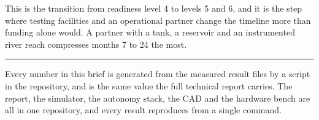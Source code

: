 \documentclass[10pt,a4paper]{article}
\begin{document}
This is the transition from readiness level 4 to levels 5 and 6, and it is the
step where testing facilities and an operational partner change the timeline
more than funding alone would. A partner with a tank, a reservoir and an
instrumented river reach compresses months 7 to 24 the most.

\vspace{2mm}
{\color{accent}\rule{\linewidth}{0.6pt}}

{\small Every number in this brief is generated from the measured result files
by a script in the repository, and is the same value the full technical report
carries. The report, the simulator, the autonomy stack, the CAD and the
hardware bench are all in one repository, and every result reproduces from a
single command.}
\end{document}
